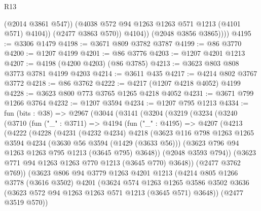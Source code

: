 \begin{lexlean}{R13}
\begin{coremodule}
                    (@2014 @3861 @547))
                  (@4038 @572 @94 @1263 @1263 @571 @1213 (@4101 @571) @4104))
                (@2477 @3863 @570))
              @4104))
          (@2048 @3856 @3865))))
@4195 := @3306 @1479
@4198 := @3671 @809 @3782 @3787
@4199 := @86 @3770
@4200 := @1207 @4199
@4201 := @86 @3776
@4203 := @1207 @4201 @1213
@4207 := @4198 (@4200 @4203) (@86 @3785)
@4213 := @3623 @803 @808 @3773 @3781 @4199 @4203
@4214 := @3611 @435
@4217 := @4214 @802 @3767 @3772
@4218 := @86 @3762
@4222 := @4217 (@1207 @4218 @4052) @4199
@4228 := @3623 @800 @773 @3765 @1265 @4218 @4052
@4231 := @3671 @799 @1266 @3764
@4232 := @1207 @3594
@4234 := @1207 @795 @1213
@4334 := fun (bits : @38) =>
  @2967
    (@3044
      (@3141
        (@3204
          (@3219
            (@3234
              (@3240
                (@3710
                  (fun ("_" : @3711) =>
                  @4194
                    (fun ("_" : @4195) =>
                    @4207
                      (@4213
                        (@4222
                          (@4228
                            (@4231
                              (@4232 @4234)
                              @4218
                              (@3623
                                @116
                                @798
                                @1263
                                @1265
                                @3594
                                @4234
                                (@3630 @56 @3594 (@1429 (@3633 @56)))
                                (@3623 @796 @94 @1263 @1263 @795 @1213 (@3645 @795) @3648))
                              (@2048 @3593 @794))
                            (@3623 @771 @94 @1263 @1263 @770 @1213 (@3645 @770) @3648))
                          (@2477 @3762 @769))
                        (@3623
                          @806
                          @94
                          @3779
                          @1263
                          @4201
                          @1213
                          (@4214
                            @805
                            @1266
                            @3778
                            (@3616 @3502)
                            @4201
                            (@3624
                              @574
                              @1263
                              @1265
                              @3586
                              @3502
                              @3636
                              (@3623 @572 @94 @1263 @1263 @571 @1213 (@3645 @571) @3648))
                            (@2477 @3519 @570))

\end{coremodule}
\end{lexlean}
